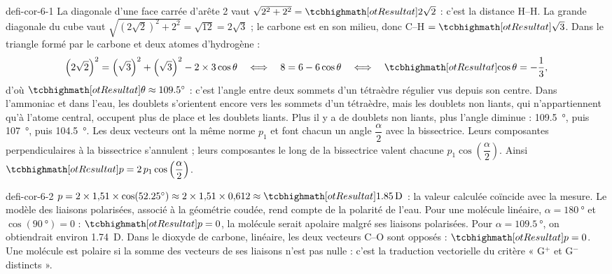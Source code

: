 \begin{blocEdition}{defi-cor-6-1}
La diagonale d'une face carrée d'arête 2 vaut $\sqrt{2^2+2^2}=\res{2\sqrt2}$ : c'est la distance H--H. La grande diagonale du cube
vaut $\sqrt{\left(2\sqrt2\right)^2+2^2}=\sqrt{12}=2\sqrt3$ ; le carbone est en son milieu, donc C--H $=\res{\sqrt3}$.
Dans le triangle formé par le carbone et deux atomes d'hydrogène :
\[\left(2\sqrt2\right)^2=\left(\sqrt3\right)^2+\left(\sqrt3\right)^2-2\times3\cos\theta\quad\Longleftrightarrow\quad8=6-6\cos\theta\quad\Longleftrightarrow\quad\res{\cos\theta=-\frac13},\]
d'où $\res{\theta\approx\qty{109,5}{\degree}}$ : c'est l'angle entre deux sommets d'un tétraèdre régulier vus depuis son centre.
Dans l'ammoniac et dans l'eau, les doublets s'orientent encore vers les sommets d'un tétraèdre, mais les doublets non
liants, qui n'appartiennent qu'à l'atome central, occupent plus de place et  les doublets liants.
Plus il y a de doublets non liants, plus l'angle diminue : \qty{109,5}{\degree}, puis \qty{107}{\degree}, puis \qty{104,5}{\degree}.
Les deux vecteurs ont la même norme $p_1$ et font chacun un angle $\dfrac{\alpha}{2}$ avec la bissectrice. Leurs composantes
perpendiculaires à la bissectrice s'annulent ; leurs composantes le long de la bissectrice valent chacune $p_1\cos\left(\dfrac{\alpha}{2}\right)$.
Ainsi $\res{p=2\,p_1\cos\left(\dfrac{\alpha}{2}\right)}$.
\end{blocEdition}

\begin{blocEdition}{defi-cor-6-2}
\label{figedition-defi-cor-6-2-1}
$p=2\times1{,}51\times\cos(\qty{52,25}{\degree})\approx2\times1{,}51\times0{,}612\approx\res{\qty{1,85}{D}}$ : la valeur calculée coïncide avec la
mesure. Le modèle des liaisons polarisées, associé à la géométrie coudée, rend compte de la polarité de l'eau.
Pour une molécule linéaire, $\alpha=\qty{180}{\degree}$ et $\cos(\qty{90}{\degree})=0$ : $\res{p=0}$, la molécule serait apolaire malgré ses liaisons
polarisées. Pour $\alpha=\qty{109,5}{\degree}$, on obtiendrait environ \qty{1,74}{D}. Dans le dioxyde de carbone, linéaire, les deux vecteurs
C--O sont opposés : $\res{p=0}$. Une molécule est polaire si la somme des vecteurs de ses liaisons n'est pas nulle :
c'est la traduction vectorielle du critère « G$^{+}$ et G$^{-}$ distincts ».
\end{blocEdition}

